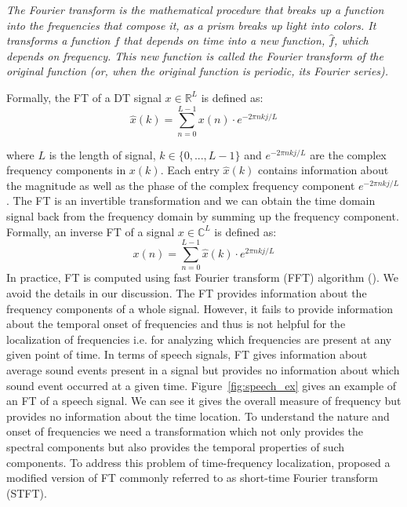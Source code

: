 \emph{The Fourier transform is the mathematical procedure that breaks up a function into the frequencies that
compose it, as a prism breaks up light into colors. It transforms a function $f$ that depends on time into a
new function, $\hat{f}$, which depends on frequency. This new function is called the Fourier transform of the
original function (or, when the original function is periodic, its Fourier series).}

Formally, the FT of a DT signal $x\in \mathbb{R}^{L}$ is defined as:
\begin{equation}
    \hat{x}(k) = \sum_{n=0}^{L-1}  x(n)\cdot e^{-2\pi nkj/L}
\end{equation}

where $L$ is the length of signal, $k\in\{0,...,L-1\}$ and $e^{-2\pi nkj/L}$ are the complex frequency components in $x(k)$.
Each entry $\hat{x}(k)$ contains information about the magnitude as well as the phase of the complex frequency component $e^{-2\pi nkj/L}$. The FT is an invertible transformation and we can obtain the time domain signal back from the frequency domain by summing up the frequency component. Formally, an inverse FT of a signal $x\in \mathbb{C}^{L}$ is defined as:
\begin{equation}
    x(n) = \sum_{n=0}^{L-1}  \hat{x}(k)\cdot e^{2\pi nkj/L}
\end{equation}
In practice, FT is computed using fast Fourier transform (FFT) algorithm (\cite{heideman1984gauss}). We avoid the details in our discussion. The FT provides information about the frequency components of a whole signal. However, it fails to provide information about the temporal onset of frequencies and thus is not helpful for the localization of frequencies i.e. for analyzing which frequencies are present at any given point of time. In terms of speech signals, FT gives information about average sound events present in a signal but provides no information about which sound event occurred at a given time. Figure~\ref{fig:speech_ex} gives an example of an FT of a speech signal. We can see it gives the overall measure of frequency but provides no information about the time location. To understand the nature and onset of frequencies we need a transformation which not only provides the spectral components but also provides the temporal properties of such components. To address this problem of time-frequency localization, \cite{gabor1946theory} proposed a modified version of FT commonly referred to as short-time Fourier transform (STFT).

